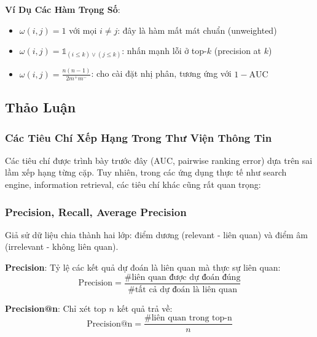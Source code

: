 \textbf{Ví Dụ Các Hàm Trọng Số}:

\begin{itemize}
    \item $\omega(i,j) = 1$ với mọi $i \neq j$: đây là hàm mất mát chuẩn (unweighted)
    \item $\omega(i,j) = \mathbb{1}_{(i \leq k) \vee (j \leq k)}$: nhấn mạnh lỗi ở top-$k$ (precision at $k$)
    \item $\omega(i,j) = \frac{n(n-1)}{2m^+m^-}$: cho cài đặt nhị phân, tương ứng với $1 - \text{AUC}$
\end{itemize}

\vspace{0.5cm}



\subsection{Thảo Luận}

\subsubsection{Các Tiêu Chí Xếp Hạng Trong Thư Viện Thông Tin}

Các tiêu chí được trình bày trước đây (AUC, pairwise ranking error) dựa trên sai lầm xếp hạng từng cặp. Tuy nhiên, trong các ứng dụng thực tế như search engine, information retrieval, các tiêu chí khác cũng rất quan trọng:

\subsubsection{Precision, Recall, Average Precision}

Giả sử dữ liệu chia thành hai lớp: điểm dương (relevant - liên quan) và điểm âm (irrelevant - không liên quan).

\textbf{Precision}: Tỷ lệ các kết quả dự đoán là liên quan mà thực sự liên quan:
\begin{equation}
\text{Precision} = \frac{\#\text{liên quan được dự đoán đúng}}{\text{\#tất cả dự đoán là liên quan}}
\end{equation}

\textbf{Precision@n}: Chỉ xét top $n$ kết quả trả về:
\begin{equation}
\text{Precision@n} = \frac{\#\text{liên quan trong top-n}}{n}
\end{equation}

